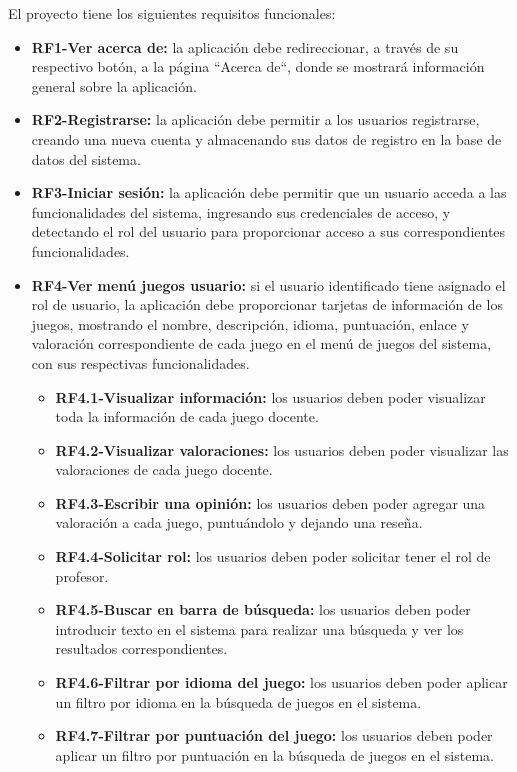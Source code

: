 El proyecto tiene los siguientes requisitos funcionales:
\begin{itemize}
\tightlist
    \item \textbf{RF1-Ver acerca de:} la aplicación debe redireccionar, a través de su respectivo botón, a la página ``Acerca de``, donde se mostrará información general sobre la aplicación.
    \item \textbf{RF2-Registrarse:} la aplicación debe permitir a los usuarios registrarse, creando una nueva cuenta y almacenando sus datos de registro en la base de datos del sistema.
    \item \textbf{RF3-Iniciar sesión:} la aplicación debe permitir que un usuario acceda a las funcionalidades del sistema, ingresando sus credenciales de acceso, y detectando el rol del usuario para proporcionar acceso a sus correspondientes funcionalidades.
    \item \textbf{RF4-Ver menú juegos usuario:} si el usuario identificado tiene asignado el rol de usuario, la aplicación debe proporcionar tarjetas de información de los juegos, mostrando el nombre, descripción, idioma, puntuación, enlace y valoración correspondiente de cada juego en el menú de juegos del sistema, con sus respectivas funcionalidades.
        \begin{itemize}
        \tightlist
            \item \textbf{RF4.1-Visualizar información:} los usuarios deben poder visualizar toda la información de cada juego docente.
            \item \textbf{RF4.2-Visualizar valoraciones:} los usuarios deben poder visualizar las valoraciones de cada juego docente.
            \item \textbf{RF4.3-Escribir una opinión:} los usuarios deben poder agregar una valoración a cada juego, puntuándolo y dejando una reseña.
            \item \textbf{RF4.4-Solicitar rol:} los usuarios deben poder solicitar tener el rol de profesor.
            \item \textbf{RF4.5-Buscar en barra de búsqueda:} los usuarios deben poder introducir texto en el sistema para realizar una búsqueda y ver los resultados correspondientes.
            \item \textbf{RF4.6-Filtrar por idioma del juego:} los usuarios deben poder aplicar un filtro por idioma en la búsqueda de juegos en el sistema.
            \item\textbf{RF4.7-Filtrar por puntuación del juego:} los usuarios deben poder aplicar un filtro por puntuación en la búsqueda de juegos en el sistema.

\end{itemize}
\end{itemize}
